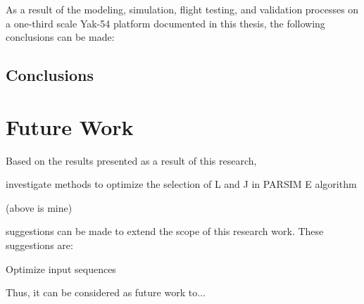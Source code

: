 As a result of the modeling, simulation, flight testing, and validation processes on a one-third scale Yak-54 platform documented in this thesis, the following conclusions can be made:

\subsection{Conclusions}



\section{Future Work}
Based on the results presented as a result of this research, 

investigate methods to optimize the selection of L and J in PARSIM E algorithm


(above is mine)





suggestions can be made to extend the scope of this research work. These suggestions are:


Optimize input sequences

Thus, it can be considered as future work to...